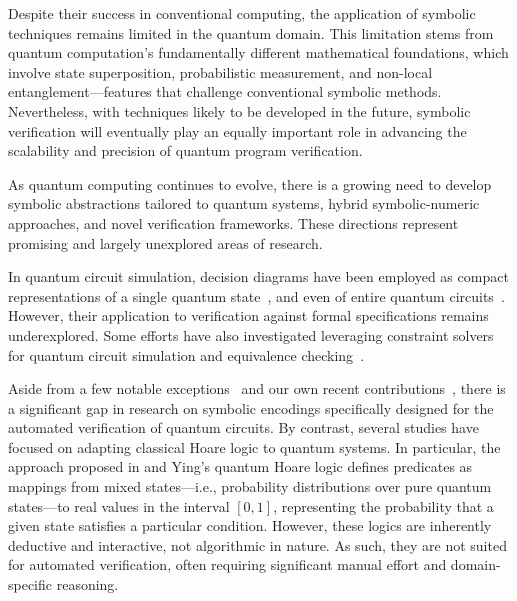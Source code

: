 Despite their success in conventional computing, the application of symbolic techniques remains limited in the quantum domain.
%
This limitation stems from quantum computation’s fundamentally different mathematical foundations, which involve state superposition, probabilistic measurement, and non-local entanglement—features that challenge conventional symbolic methods.
%
Nevertheless, with techniques likely to be developed in the future, symbolic verification will eventually play an equally important role in advancing the scalability and precision of quantum program verification.
%

As quantum computing continues to evolve, there is a growing need to develop symbolic abstractions tailored to quantum systems, hybrid symbolic-numeric approaches, and novel verification frameworks. These directions represent promising and largely unexplored areas of research.
%

In quantum circuit simulation, decision diagrams have been employed as compact representations of a single quantum state~\citep{TsaiJiangJhang2021,ChenChenJiangJobranovaLengal2024,KissingerWetering2022,10.1145/3712711}, and even of entire quantum circuits~\citep{WeiTsaiJhangJiang2022,SistlaChaudhuriReps2023,BurgholzerWille2020,Vinkhuijzen2023limdd}. However, their application to verification against formal specifications remains underexplored. Some efforts have also investigated leveraging constraint solvers for quantum circuit simulation and equivalence checking~\citep{MeiBonsangueLaarman2024Sim,MeiCoopmansLaarman2024Eq}.

Aside from a few notable exceptions~\citep{DBLP:journals/pacmpl/0001CLLTY23,DBLP:conf/fm/BauerMarquartLS23,Chareton2021,amy2018towards} and our own recent contributions~\citep{PLanQC25,DBLP:journals/pacmpl/AbdullaCCHLLLT25,CACM25,ChenCLLTY23,ChenCLLT23,chen2025autoq}, there is a significant gap in research on symbolic encodings specifically designed for the automated verification of quantum circuits.
%
By contrast, several studies have focused on adapting classical Hoare logic to quantum systems. In particular, the approach proposed in \citep{d2006quantum} and Ying’s quantum Hoare logic \citep{ying2012floyd} defines predicates as mappings from mixed states—i.e., probability distributions over pure quantum states—to real values in the interval $[0,1]$, representing the probability that a given state satisfies a particular condition.
%
However, these logics are inherently deductive and interactive, not algorithmic in nature. As such, they are not suited for automated verification, often requiring significant manual effort and domain-specific reasoning.
%

